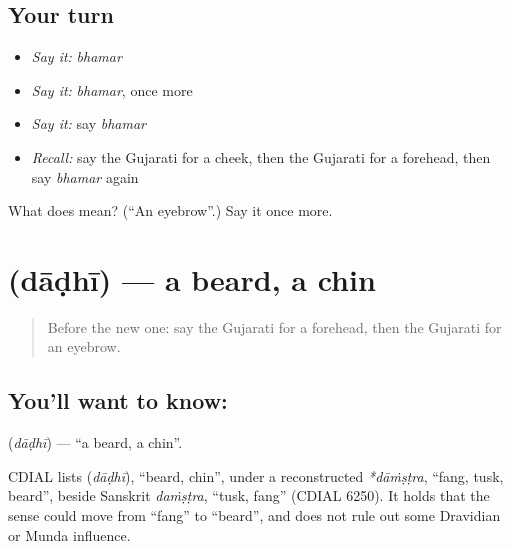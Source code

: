 \subsection*{Your turn}
\begin{itemize}
\raggedright
  \item \emph{Say it:} \emph{bhamar}
  \item \emph{Say it:} \emph{bhamar}, once more
  \item \emph{Say it:} say \emph{bhamar}
  \item \emph{Recall:} say the Gujarati for a cheek, then the Gujarati for a forehead, then say \emph{bhamar} again
\end{itemize}

\begin{tcolorbox}[breakable,colback=teal!4,colframe=teal!35!black,title={Before you move on}]
What does  mean? (\textquotedblleft{}An eyebrow\textquotedblright{}.) Say it once more.
\end{tcolorbox}
\section[\texorpdfstring{\gu{દાઢી} (dāḍhī)}{દાઢી (dāḍhī)}]{ (dāḍhī) — a beard, a chin}

\label{lesson:GU-C125-dadhi}



\begin{quote}
Before the new one: say the Gujarati for a forehead, then the Gujarati for an eyebrow.
\end{quote}

\subsection*{You'll want to know: }
\textbf{} (\emph{dāḍhī}) — \textquotedblleft{}a beard, a chin\textquotedblright{}.

\begin{cousinweb}
CDIAL lists \textbf{} (\emph{dāḍhī}), \textquotedblleft{}beard, chin\textquotedblright{}, under a reconstructed \emph{*dāṁṣṭra}, \textquotedblleft{}fang, tusk, beard\textquotedblright{}, beside Sanskrit \emph{daṁṣṭra}, \textquotedblleft{}tusk, fang\textquotedblright{} (CDIAL 6250). It holds that the sense could move from \textquotedblleft{}fang\textquotedblright{} to \textquotedblleft{}beard\textquotedblright{}, and does not rule out some Dravidian or Munda influence.
\end{cousinweb}

